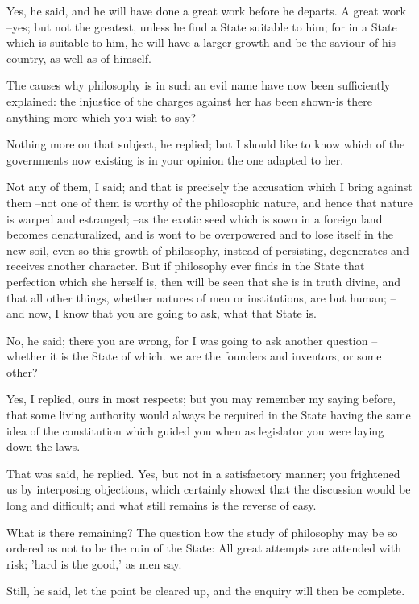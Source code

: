 Yes, he said, and he will have done a great work before he departs.
A great work --yes; but not the greatest, unless he find a State suitable to him; for in a State which is suitable to him, he will have a larger growth and be the saviour of his country, as well as of himself.

The causes why philosophy is in such an evil name have now been sufficiently explained: the injustice of the charges against her has been shown-is there anything more which you wish to say?

Nothing more on that subject, he replied; but I should like to know which of the governments now existing is in your opinion the one adapted to her.

Not any of them, I said; and that is precisely the accusation which I bring against them --not one of them is worthy of the philosophic nature, and hence that nature is warped and estranged; --as the exotic seed which is sown in a foreign land becomes denaturalized, and is wont to be overpowered and to lose itself in the new soil, even so this growth of philosophy, instead of persisting, degenerates and receives another character. But if philosophy ever finds in the State that perfection which she herself is, then will be seen that she is in truth divine, and that all other things, whether natures of men or institutions, are but human; --and now, I know that you are going to ask, what that State is.

No, he said; there you are wrong, for I was going to ask another question --whether it is the State of which. we are the founders and inventors, or some other?

Yes, I replied, ours in most respects; but you may remember my saying before, that some living authority would always be required in the State having the same idea of the constitution which guided you when as legislator you were laying down the laws.

That was said, he replied.
Yes, but not in a satisfactory manner; you frightened us by interposing objections, which certainly showed that the discussion would be long and difficult; and what still remains is the reverse of easy.

What is there remaining?
The question how the study of philosophy may be so ordered as not to be the ruin of the State: All great attempts are attended with risk; 'hard is the good,' as men say.

Still, he said, let the point be cleared up, and the enquiry will then be complete.

